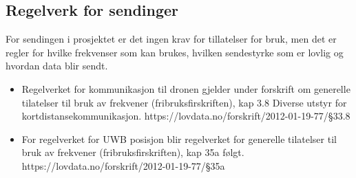 \subsection{Regelverk for sendinger}
For sendingen i prosjektet er det ingen krav for tillatelser for bruk, men det er regler for hvilke frekvenser som kan brukes, hvilken sendestyrke som er lovlig og hvordan data blir sendt.
\begin{itemize}
\item Regelverket for kommunikasjon til dronen gjelder under forskrift om generelle tilatelser til bruk av frekvener (fribruksfirskriften), kap 3.8 Diverse utstyr for kortdistansekommunikasjon. https://lovdata.no/forskrift/2012-01-19-77/§33.8   
\item For regelverket for UWB posisjon blir regelverket for generelle tilatelser til bruk av frekvener (fribruksfirskriften), kap 35a følgt.   https://lovdata.no/forskrift/2012-01-19-77/§35a 
\end{itemize}